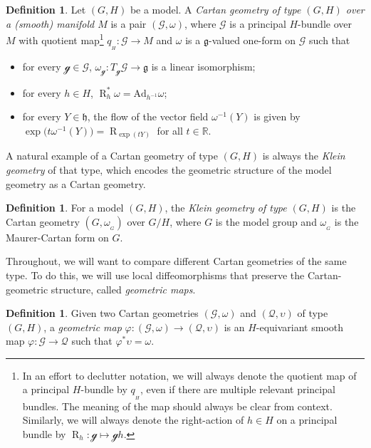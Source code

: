 \documentclass[pdftex]{sigma}
\numberwithin{equation}{section}
\theoremstyle{definition}
\newtheorem{Definition}[Theorem]{Definition}
\newcommand{\Ad}{\mathrm{Ad}}
\newcommand{\MC}[1]{\omega_{{}_{#1}}}
\newcommand{\Rt}[1]{\operatorname{R}_{#1}}
\begin{document}
\begin{Definition}Let $(G,H)$ be a model. A \emph{Cartan geometry of type $(G,H)$ over a (smooth) manifold $M$} is a pair $(\mathscr{G},\omega)$, where $\mathscr{G}$ is a principal $H$-bundle over $M$ with quotient map\footnote{In an effort to declutter notation, we will always denote the quotient map of a principal $H$-bundle by $q_{{}_H}$, even if there are multiple relevant principal bundles. The meaning of the map should always be clear from context. Similarly, we will always denote the right-action of $h\in H$ on a principal bundle by $\Rt{h}\colon \mathscr{g}\mapsto\mathscr{g}h$.} $q_{{}_H}\colon \mathscr{G}\to M$ and $\omega$ is a $\mathfrak{g}$-valued one-form on $\mathscr{G}$ such that
\begin{itemize}\itemsep=0pt
\item for every $\mathscr{g}\in\mathscr{G}$, $\omega_\mathscr{g} \colon T_\mathscr{g}\mathscr{G}\to\mathfrak{g}$ is a linear isomorphism;
\item for every $h\in H$, $\Rt{h}^*\omega=\Ad_{h^{-1}}\omega$;
\item for every $Y\in\mathfrak{h}$, the flow of the vector field $\omega^{-1}(Y)$ is given by $\exp\bigl(t\omega^{-1}(Y)\bigr)=\Rt{\exp(tY)}$ for all $t\in\mathbb{R}$.\end{itemize}\end{Definition}

A natural example of a Cartan geometry of type $(G,H)$ is always the \emph{Klein geometry} of that type, which encodes the geometric structure of the model geometry as a Cartan geometry.

\begin{Definition}For a model $(G,H)$, the \emph{Klein geometry of type $(G,H)$} is the Cartan geometry $(G,\MC{G})$ over $G/H$, where $G$ is the model group and $\MC{G}$ is the Maurer-Cartan form on $G$.\end{Definition}

Throughout, we will want to compare different Cartan geometries of the same type. To do this, we will use local diffeomorphisms that preserve the Cartan-geometric structure, called \emph{geometric maps}.

\begin{Definition}Given two Cartan geometries $(\mathscr{G},\omega)$ and $(\mathscr{Q},\upsilon)$ of type $(G,H)$, a \emph{geometric map} $\varphi\colon (\mathscr{G},\omega)\to (\mathscr{Q},\upsilon)$ is an $H$-equivariant smooth map $\varphi\colon \mathscr{G}\to\mathscr{Q}$ such that $\varphi^*\upsilon=\omega$.\end{Definition}
\end{document}
